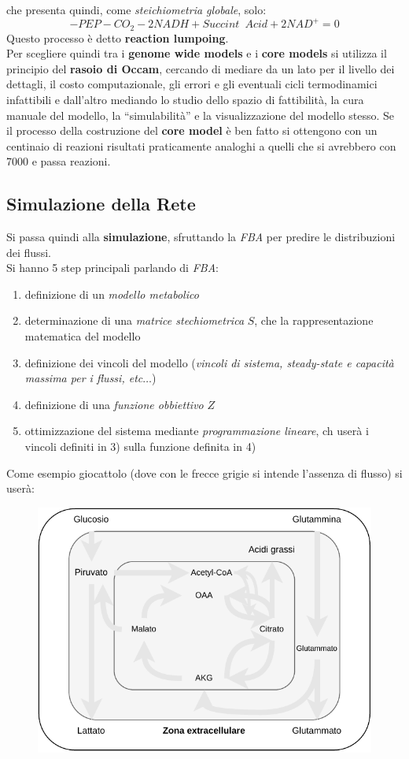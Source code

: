 \documentclass[a4paper,12pt, oneside]{book}
\begin{document}
che presenta quindi, come \textit{steichiometria globale}, solo:
\[-PEP-CO_2-2NADH+Succint\,\,\,Acid+2NAD^{+}=0\]
Questo processo è detto \textbf{reaction lumpoing}.\\
Per scegliere quindi tra i \textbf{genome wide models} e i \textbf{core models}
si utilizza il principio del \textbf{rasoio di Occam}, cercando di mediare da un
lato per il livello dei dettagli, il costo computazionale, gli errori e gli
eventuali cicli termodinamici infattibili e dall'altro mediando lo studio dello
spazio di fattibilità, la cura manuale del modello, la ``simulabilità'' e la
visualizzazione del modello stesso. Se il processo della costruzione del
\textbf{core model} è ben fatto si ottengono con un centinaio di reazioni
risultati praticamente analoghi a quelli che si avrebbero con 7000 e passa
reazioni.
\subsection{Simulazione della Rete}
Si passa quindi alla \textbf{simulazione}, sfruttando la \textit{FBA} per
predire le distribuzioni dei flussi.\\
Si hanno 5 step principali parlando di \textit{FBA}:
\begin{enumerate}
  \item definizione di un \textit{modello metabolico}
  \item determinazione di una \textit{matrice stechiometrica} $S$, che la
  rappresentazione matematica del modello 
  \item definizione dei vincoli del modello (\textit{vincoli di sistema,
    steady-state e 
  capacità massima per i flussi, etc$\ldots$}) 
  \item definizione di una \textit{funzione obbiettivo} $Z$
  \item ottimizzazione del sistema mediante \textit{programmazione lineare}, ch
  userà i vincoli definiti in 3) sulla funzione definita in 4)
\end{enumerate}
Come esempio giocattolo (dove con le frecce grigie si intende l'assenza di
flusso) si userà: 
\begin{figure}[H]
  \centering
  \includegraphics[scale = 0.8]{img/toyclear.pdf}
\end{figure}
\end{document}
